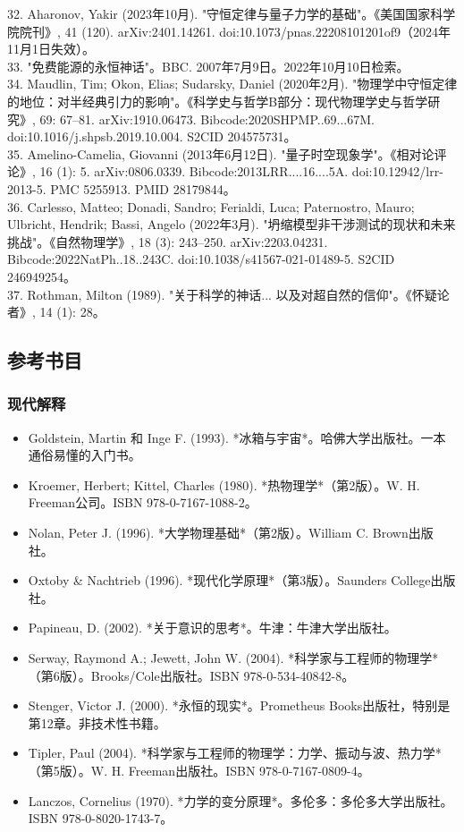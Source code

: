 32. Aharonov, Yakir (2023年10月). "守恒定律与量子力学的基础"。《美国国家科学院院刊》, 41 (120). arXiv:2401.14261. doi:10.1073/pnas.22208101201of9（2024年11月1日失效）。\\
33. "免费能源的永恒神话"。BBC. 2007年7月9日。2022年10月10日检索。\\
34. Maudlin, Tim; Okon, Elias; Sudarsky, Daniel (2020年2月). "物理学中守恒定律的地位：对半经典引力的影响"。《科学史与哲学B部分：现代物理学史与哲学研究》, 69: 67–81. arXiv:1910.06473. Bibcode:2020SHPMP..69...67M. doi:10.1016/j.shpsb.2019.10.004. S2CID 204575731。\\
35. Amelino-Camelia, Giovanni (2013年6月12日). "量子时空现象学"。《相对论评论》, 16 (1): 5. arXiv:0806.0339. Bibcode:2013LRR....16....5A. doi:10.12942/lrr-2013-5. PMC 5255913. PMID 28179844。\\
36. Carlesso, Matteo; Donadi, Sandro; Ferialdi, Luca; Paternostro, Mauro; Ulbricht, Hendrik; Bassi, Angelo (2022年3月). "坍缩模型非干涉测试的现状和未来挑战"。《自然物理学》, 18 (3): 243–250. arXiv:2203.04231. Bibcode:2022NatPh..18..243C. doi:10.1038/s41567-021-01489-5. S2CID 246949254。\\
37. Rothman, Milton (1989). "关于科学的神话... 以及对超自然的信仰"。《怀疑论者》, 14 (1): 28。
\subsection{参考书目}
\subsubsection{现代解释}
\begin{itemize}
\item Goldstein, Martin 和 Inge F. (1993). *冰箱与宇宙*。哈佛大学出版社。一本通俗易懂的入门书。
\item Kroemer, Herbert; Kittel, Charles (1980). *热物理学*（第2版）。W. H. Freeman公司。ISBN 978-0-7167-1088-2。
\item Nolan, Peter J. (1996). *大学物理基础*（第2版）。William C. Brown出版社。
\item Oxtoby & Nachtrieb (1996). *现代化学原理*（第3版）。Saunders College出版社。
\item Papineau, D. (2002). *关于意识的思考*。牛津：牛津大学出版社。
\item Serway, Raymond A.; Jewett, John W. (2004). *科学家与工程师的物理学*（第6版）。Brooks/Cole出版社。ISBN 978-0-534-40842-8。
\item Stenger, Victor J. (2000). *永恒的现实*。Prometheus Books出版社，特别是第12章。非技术性书籍。
\item Tipler, Paul (2004). *科学家与工程师的物理学：力学、振动与波、热力学*（第5版）。W. H. Freeman出版社。ISBN 978-0-7167-0809-4。
\item Lanczos, Cornelius (1970). *力学的变分原理*。多伦多：多伦多大学出版社。ISBN 978-0-8020-1743-7。
\end{itemize}
